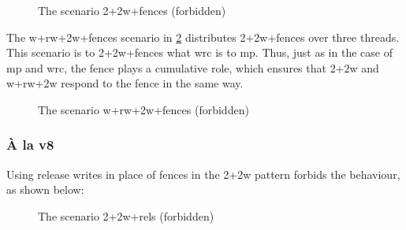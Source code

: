 \documentclass[a4paper]{article}
\begin{document}
\begin{figure}[!h] 
\vspace*{-8mm}
\begin{center}
\end{center}
\vspace*{-8mm}
\caption{The scenario \textsf{2+2w+fences}\label{fig:2+2w} (forbidden)} 
\end{figure}

The \textsf{w+rw+2w+fences} scenario in \myfig\ref{fig:w+rw+2w} distributes
\textsf{2+2w+fences} over three threads.  This scenario is to
\textsf{2+2w+fences} what \textsf{wrc} is to \textsf{mp}. Thus, just as in the
case of \textsf{mp} and \textsf{wrc}, the fence plays a cumulative role, which
ensures that \textsf{2+2w} and \textsf{w+rw+2w} respond to the fence in the
same way.

\begin{figure}[!h] 
\begin{center}
\end{center}
\vspace*{-10mm}
\caption{The scenario \textsf{w+rw+2w+fences} \label{fig:w+rw+2w} (forbidden)} 
\end{figure}


\subsubsection{\`A la v8}

Using release writes in place of fences in the \textsf{2+2w} pattern forbids
the behaviour, as shown below:

\begin{figure}[!h] 
\vspace*{-8mm}
\begin{center}
\end{center}
\vspace*{-8mm}
\caption{The scenario \textsf{2+2w+rels}\label{fig:2+2w+rels} (forbidden)} 
\end{figure}
\end{document}

